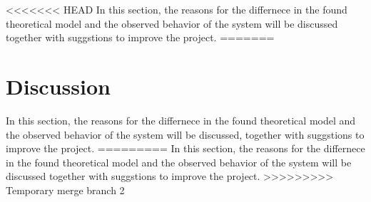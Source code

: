 \documentclass[../../main]{subfiles}
\begin{document}
<<<<<<< HEAD
In this section, the reasons for the differnece in the found theoretical model and the observed behavior of the system will be discussed together with suggstions to improve the project.
=======
\section{Discussion}
\label{sec:discussion}
In this section, the reasons for the differnece in the found theoretical model and the observed behavior of the system will be discussed, together with suggstions to improve the project.
=========
In this section, the reasons for the differnece in the found theoretical model and the observed behavior of the system will be discussed together with suggstions to improve the project.
>>>>>>>>> Temporary merge branch 2
\end{document}
